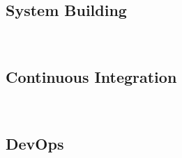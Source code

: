 \subsection{System Building}
\begin{frame}{\insertsubsection\ \mytitlesource{\sommerville}}
	\frameSystemBuilding
\end{frame}

\subsection{Continuous Integration}
\begin{frame}{\insertsubsection\ \mytitlesource{\sommerville}}
	\frameContinousIntegration
\end{frame}


\subsection{DevOps}
\begin{frame}{\insertsubsection\ \mytitlesource{\handbuch}}
	\frameDevOps
\end{frame}

\begin{frame}{\insertsubsection}
	\centering{}
\end{frame}

